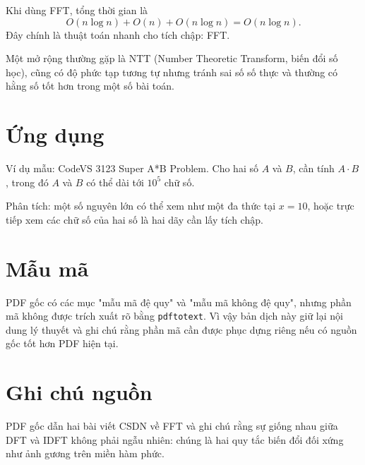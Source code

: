\documentclass[11pt]{article}
\begin{document}
Khi dùng FFT, tổng thời gian là
\[
  O(n\log n)+O(n)+O(n\log n)=O(n\log n).
\]
Đây chính là thuật toán nhanh cho tích chập: FFT.

Một mở rộng thường gặp là NTT (Number Theoretic Transform, biến đổi số học),
cũng có độ phức tạp tương tự nhưng tránh sai số số thực và thường có hằng số
tốt hơn trong một số bài toán.

\section{Ứng dụng}

Ví dụ mẫu: CodeVS 3123 Super A*B Problem. Cho hai số $A$ và $B$, cần tính
$A\cdot B$, trong đó $A$ và $B$ có thể dài tới $10^5$ chữ số.

Phân tích: một số nguyên lớn có thể xem như một đa thức tại $x=10$, hoặc trực
tiếp xem các chữ số của hai số là hai dãy cần lấy tích chập.

\section{Mẫu mã}

PDF gốc có các mục "mẫu mã đệ quy" và "mẫu mã không đệ quy", nhưng phần mã
không được trích xuất rõ bằng \texttt{pdftotext}. Vì vậy bản dịch này giữ lại
nội dung lý thuyết và ghi chú rằng phần mã cần được phục dựng riêng nếu có
nguồn gốc tốt hơn PDF hiện tại.

\section*{Ghi chú nguồn}

PDF gốc dẫn hai bài viết CSDN về FFT và ghi chú rằng sự giống nhau giữa DFT và
IDFT không phải ngẫu nhiên: chúng là hai quy tắc biến đổi đối xứng như ảnh
gương trên miền hàm phức.
\end{document}
